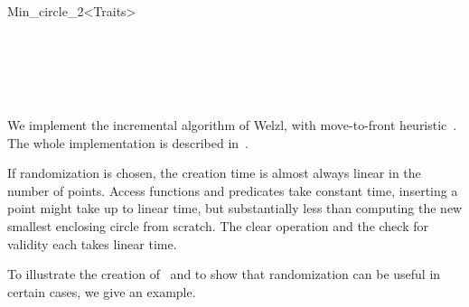 \begin{ccRefClass}{Min_circle_2<Traits>}
\begin{ccIndexGlobalFunctions}

\end{ccIndexGlobalFunctions}

\ccSeeAlso

\\
\\[1ex]
\\[1ex]
\\[1ex]

\ccImplementation
\ccIndexImplementation

We implement the incremental algorithm of Welzl, with move-to-front
heuristic~\cite{w-sedbe-91a}. The whole implementation is described
in~\cite{cgal:gs-seceg-98}.

If randomization is
chosen, the creation time is almost always linear in the number of points.
Access functions and predicates take constant time, inserting a point might
take up to linear time, but substantially less than computing the new
smallest enclosing circle from scratch. The clear operation and the check
for validity each takes linear time.

\ccExample
{}

To illustrate the creation of \ccRefName\ and to show that
randomization can be useful in certain cases, we give an example.



\ccRestoreThreeColumns

\end{ccRefClass}


